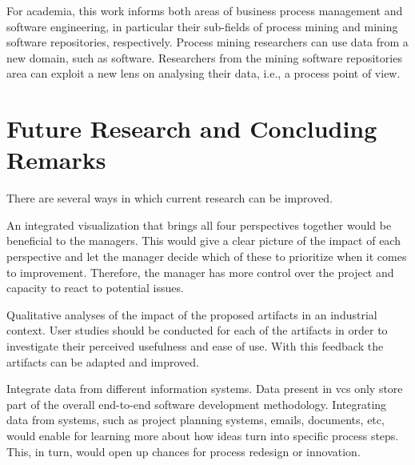 For academia, this work informs both areas of business process management and software engineering, in particular their sub-fields of process mining and mining software repositories, respectively. Process mining researchers can use data from a new domain, such as software. Researchers from the mining software repositories area can exploit a new lens on analysing their data, i.e., a process point of view. 


\section{Future Research and Concluding Remarks}
\label{sec:8-future}

There are several ways in which current research can be improved. 

An integrated visualization that brings all four perspectives together would be beneficial to the managers. This would give a clear picture of the impact of each perspective and let the manager decide which of these to prioritize when it comes to improvement. Therefore, the manager has more control over the project and capacity to react to potential issues. 

Qualitative analyses of the impact of the proposed artifacts in an industrial context. User studies should be conducted for each of the artifacts in order to investigate their perceived usefulness and ease of use. With this feedback the artifacts can be adapted and improved. 

Integrate data from different information systems. Data present in \gls{vcs} only store part of the overall end-to-end software development methodology. Integrating data from systems, such as project planning systems, emails, documents, etc, would enable for learning more about how ideas turn into specific process steps. This, in turn, would open up chances for process redesign or innovation. 









